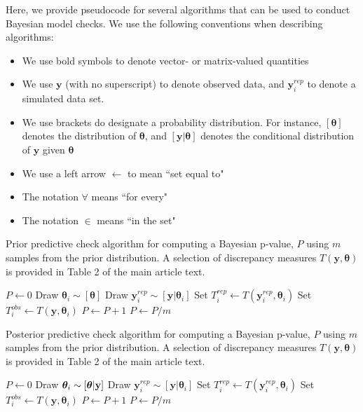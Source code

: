 \documentclass[12pt,english]{article}
\begin{document}
\rm \begin{flushleft}

Here, we provide pseudocode for several algorithms that can be used to conduct Bayesian model checks.  We use the following conventions when describing algorithms:
\begin{itemize}
  \item We use bold symbols to denote vector- or matrix-valued quantities
  \item We use $\textbf{y}$ (with no superscript) to denote observed data, and $\textbf{y}_i^{rep}$ to denote a simulated data set.
  \item We use brackets do designate a probability distribution.  For instance, $[\boldsymbol{\theta}]$ denotes the distribution of $\boldsymbol{\theta}$, and $[\textbf{y}|\boldsymbol{\theta}]$ denotes the conditional distribution of $\textbf{y}$ given $\boldsymbol{\theta}$
  \item We use a left arrow $\leftarrow$ to mean ``set equal to"
  \item The notation $\forall$ means ``for every"
  \item The notation $\in$ means ``in the set"
\end{itemize}


\begin{algorithm}
\caption{Prior predictive check algorithm for computing a Bayesian p-value, $P$ using $m$ samples from the prior distribution. A selection of discrepancy measures $T(\textbf{y},\boldsymbol{\theta})$ is provided in Table 2 of the main article text.}
\label{alg:prior}
\begin{algorithmic}
\STATE $P \leftarrow 0$
  \STATE Draw $\boldsymbol{\theta}_i \sim [\boldsymbol{\theta}]$
  \STATE Draw $\textbf{y}_i^{rep} \sim [\textbf{y} | \boldsymbol{\theta}_i]$ \STATE Set $T_i^{rep} \leftarrow T(\textbf{y}_i^{rep},\boldsymbol{\theta}_i)$
  \STATE Set $T_i^{obs} \leftarrow T(\textbf{y},\boldsymbol{\theta}_i)$
    \STATE $P \leftarrow P+1$
  \ENDIF
\ENDFOR
\STATE $P \leftarrow P/m$
\end{algorithmic}
\end{algorithm}

\begin{algorithm}
\caption{Posterior predictive check algorithm for computing a Bayesian p-value, $P$ using $m$ samples from the prior distribution.  A selection of discrepancy measures $T(\textbf{y},\boldsymbol{\theta})$ is provided in Table 2 of the main article text.}
\label{alg:posterior}
\begin{algorithmic}
\STATE $P \leftarrow 0$
  \STATE Draw $\boldsymbol{\theta}_i \sim [\boldsymbol{\theta}|{\bf y}]$
  \STATE Draw $\textbf{y}_i^{rep} \sim [\textbf{y} | \boldsymbol{\theta}_i]$ \STATE Set $T_i^{rep} \leftarrow T(\textbf{y}_i^{rep},\boldsymbol{\theta}_i)$
  \STATE Set $T_i^{obs} \leftarrow T(\textbf{y},\boldsymbol{\theta}_i)$
    \STATE $P \leftarrow P+1$
  \ENDIF
\ENDFOR
\STATE $P \leftarrow P/m$
\end{algorithmic}
\end{algorithm}


\end{flushleft}
\end{document}
